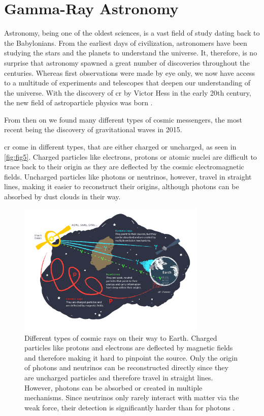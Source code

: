 \chapter{Gamma-Ray Astronomy}
\label{ch:gamma-ray-astronomy}

Astronomy, being one of the oldest sciences, is a vast field of study dating back to the Babylonians.
From the earliest days of civilization, astronomers have been studying the stars and the planets to
understand the universe. It, therefore, is no surprise that astronomy spawned a great number of discoveries
throughout the centuries. Whereas first observations were made by eye only, we now have access to a multitude
of experiments and telescopes that deepen our understanding of the universe. With the discovery of
\gls{cr} by Victor Hess in the early 20th century, the new field of astroparticle physics was born \cite{longair1981}.

From then on we found many different types of cosmic messengers, the most recent being the discovery of
gravitational waves in 2015.

\gls{cr} come in different types, that are either charged or uncharged, as seen in \autoref{fig:fig5}.
Charged particles like electrons, protons or atomic nuclei are difficult to trace back to their origin
as they are deflected by the cosmic electromagnetic fields. Uncharged particles like photons or
neutrinos, however, travel in straight lines, making it easier to reconstruct their origins,
although photons can be absorbed by dust clouds in their way.

\begin{figure}
    \centering
    \includegraphics[width=0.8\textwidth]{graphics/figure5.png}
    \caption{Different types of cosmic rays on their way to Earth. Charged particles like protons and electrons
    are deflected by magnetic fields and therefore making it hard to pinpoint the source. Only the
    origin of photons and neutrinos can be reconstructed directly since they are uncharged particles
    and therefore travel in straight lines. However, photons can be absorbed or created in multiple
    mechanisms. Since neutrinos only rarely interact with matter via the weak force, their detection
    is significantly harder than for photons \cite{fig5}.}
    \label{fig:fig5}
\end{figure}

